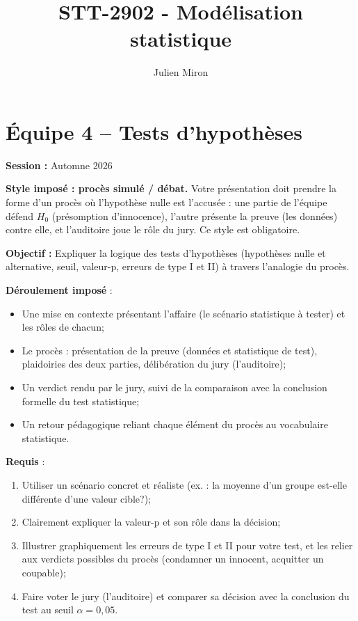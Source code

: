 \documentclass{article}
\title{STT-2902 - Modélisation statistique}
\author{Julien Miron}
\begin{document}
\section*{Équipe 4 – Tests d'hypothèses}

\textbf{Session :} Automne 2026

\textbf{Style imposé : procès simulé / débat.} Votre présentation doit prendre la forme d'un procès où l'hypothèse nulle est l'accusée : une partie de l'équipe défend $H_0$ (présomption d'innocence), l'autre présente la preuve (les données) contre elle, et l'auditoire joue le rôle du jury. Ce style est obligatoire.

\vspace{0.5cm}
\textbf{Objectif :} Expliquer la logique des tests d'hypothèses (hypothèses nulle et alternative, seuil, valeur-p, erreurs de type I et II) à travers l'analogie du procès.

\vspace{0.5cm}
\textbf{Déroulement imposé} :
\begin{itemize}
    \item Une mise en contexte présentant l'affaire (le scénario statistique à tester) et les rôles de chacun;
    \item Le procès : présentation de la preuve (données et statistique de test), plaidoiries des deux parties, délibération du jury (l'auditoire);
    \item Un verdict rendu par le jury, suivi de la comparaison avec la conclusion formelle du test statistique;
    \item Un retour pédagogique reliant chaque élément du procès au vocabulaire statistique.
\end{itemize}

\vspace{0.5cm}
\textbf{Requis} :
\begin{enumerate}
    \item Utiliser un scénario concret et réaliste (ex. : la moyenne d'un groupe est-elle différente d'une valeur cible?);
    \item Clairement expliquer la valeur-p et son rôle dans la décision;
    \item Illustrer graphiquement les erreurs de type I et II pour votre test, et les relier aux verdicts possibles du procès (condamner un innocent, acquitter un coupable);
    \item Faire voter le jury (l'auditoire) et comparer sa décision avec la conclusion du test au seuil $\alpha = 0{,}05$.
\end{enumerate}
\end{document}

